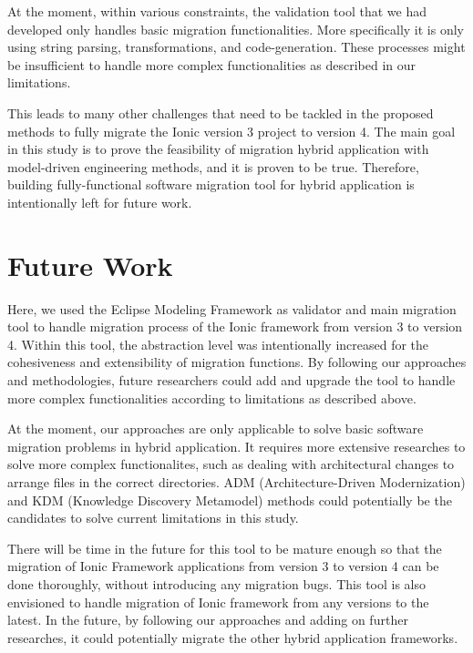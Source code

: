 \documentclass[conference]{IEEEtran}
\begin{document}
At the moment, within various constraints, the validation tool that we had developed only handles basic migration functionalities.
More specifically it is only using string parsing, transformations, and code-generation. These processes might
be insufficient to handle more complex functionalities as described in our limitations.

This leads to many other challenges that need to be tackled in the proposed methods to fully migrate the Ionic version 3 project
to version 4. The main goal in this study is to prove the feasibility of migration hybrid application with model-driven engineering
methods, and it is proven to be true. Therefore, building fully-functional software migration tool for hybrid application is intentionally 
left for future work. 

\section{Future Work}
Here, we used the Eclipse Modeling Framework as validator and main migration tool to handle migration process of 
the Ionic framework from version 3 to version 4. Within this tool, the abstraction level was intentionally 
increased for the cohesiveness and extensibility of migration functions. By following our approaches and methodologies, 
future researchers could add and upgrade the tool to handle more complex functionalities according 
to limitations as described above.

At the moment, our approaches are only applicable to solve basic software migration problems in hybrid application. 
It requires more extensive researches to solve more complex functionalites, such as dealing with 
architectural changes to arrange files in the correct directories. ADM (Architecture-Driven Modernization) and 
KDM (Knowledge Discovery Metamodel) methods \cite{b2} \cite{b6} could potentially be the candidates to solve 
current limitations in this study. 

There will be time in the future for this tool to be mature enough so that the migration of Ionic Framework applications 
from version  3 to version 4 can be done thoroughly, without introducing any migration bugs.
This tool is also envisioned to handle migration of Ionic framework from 
any versions to the latest. In the future, by following our approaches and adding on further researches, 
it could potentially migrate the other hybrid application frameworks.
\end{document}
